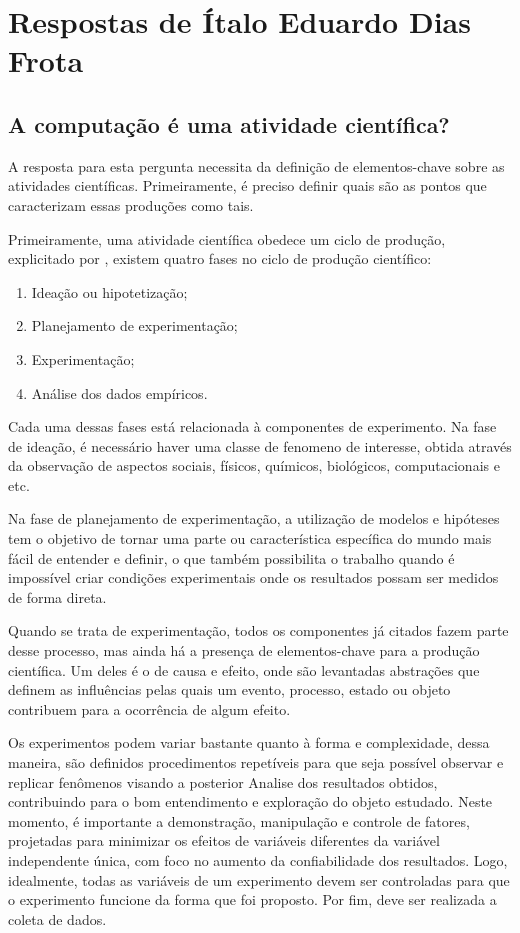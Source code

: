 \section{Respostas de Ítalo Eduardo Dias Frota\label{tarefa-titofrota-componentes-eperimento}}

\subsection{A computação é uma atividade científica?}

A resposta para esta pergunta necessita da definição de elementos-chave sobre as atividades científicas. Primeiramente, é preciso definir quais são as pontos que caracterizam essas produções como tais. 

Primeiramente, uma atividade científica obedece um ciclo de produção, explicitado por \cite[p.2]{barton_graphical_1999}, existem quatro fases no ciclo de produção científico:

\begin{enumerate}
    \item Ideação ou hipotetização; 
    \item Planejamento de experimentação;
    \item Experimentação;
    \item Análise dos dados empíricos.
\end{enumerate}

Cada uma dessas fases está relacionada à componentes de experimento. Na fase de ideação, é necessário haver uma classe de \gls{fenomeno} de interesse, obtida através da observação de aspectos sociais, físicos, químicos, biológicos, computacionais e etc. 

Na fase de planejamento de experimentação, a utilização de modelos e hipóteses tem o objetivo de tornar uma parte ou característica específica do mundo mais fácil de entender e definir, o que também possibilita o trabalho quando é impossível criar condições experimentais onde os resultados possam ser medidos de forma direta.

Quando se trata de experimentação, todos os componentes já citados fazem parte desse processo, mas ainda há a presença de elementos-chave para a produção científica. Um deles é o de causa e efeito, onde são levantadas abstrações que definem as influências pelas quais um evento, processo, estado ou objeto contribuem para a ocorrência de algum efeito. 

Os experimentos podem variar bastante quanto à forma e complexidade, dessa maneira, são definidos procedimentos repetíveis para que seja possível observar e replicar fenômenos visando a posterior \gls{Analise} dos resultados obtidos, contribuindo para o bom entendimento e exploração do objeto estudado. Neste momento, é importante a demonstração, manipulação e controle de fatores, projetadas para minimizar os efeitos de variáveis diferentes da variável independente única, com foco no aumento da confiabilidade dos resultados. Logo, idealmente, todas as variáveis de um \gls{experimento} devem ser controladas para que o experimento funcione da forma que foi proposto. Por fim, deve ser realizada a coleta de dados.

